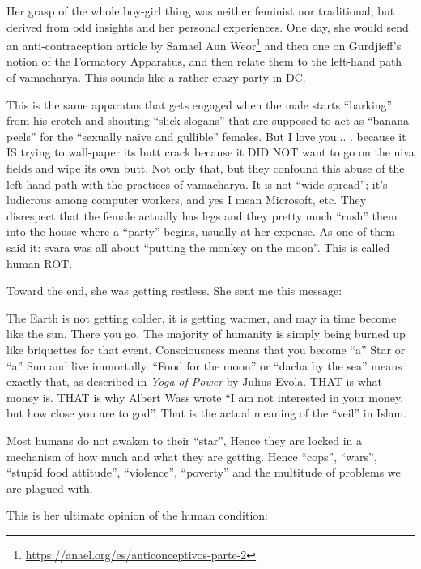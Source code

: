 Her grasp of the whole boy-girl thing was neither feminist nor traditional, but derived from odd insights and her personal experiences. One day, she would send an anti-contraception article by Samael Aun Weor\footnote{\url{https://anael.org/es/anticonceptivos-parte-2}} and then one on Gurdjieff's notion of the Formatory Apparatus, and then relate them to the left-hand path of vamacharya. This sounds like a rather crazy party in DC.

\begin{quotex}
This is the same apparatus that gets engaged when the male starts ``barking'' from his crotch and shouting ``slick slogans'' that are supposed to act as ``banana peels'' for the ``sexually naive and gullible'' females. But I love you... . because it IS trying to wall-paper its butt crack because it DID NOT want to go on the niva fields and wipe its own butt. Not only that, but they confound this abuse of the left-hand path with the practices of vamacharya. It is not ``wide-spread''; it's ludicrous among computer workers, and yes I mean Microsoft, etc. They disrespect that the female actually has legs and they pretty much ``rush'' them into the house where a ``party'' begins, usually at her expense. As one of them said it: svara was all about ``putting the monkey on the moon''. This is called human ROT.
\end{quotex}


Toward the end, she was getting restless. She sent me this message:

\begin{quotationx}
The Earth is not getting colder, it is getting warmer, and may in time become like the sun. There you go. The majority of humanity is simply being burned up like briquettes for that event. Consciousness means that you become ``a'' Star or ``a'' Sun and live immortally. ``Food for the moon'' or ``dacha by the sea'' means exactly that, as described in \emph{Yoga of Power} by Julius Evola. THAT is what money is. THAT is why Albert Wass wrote ``I am not interested in your money, but how close you are to god''. That is the actual meaning of the ``veil'' in Islam.

Most humans do not awaken to their ``star'', Hence they are locked in a mechanism of how much and what they are getting. Hence ``cops'', ``wars'', ``stupid food attitude'', ``violence'', ``poverty'' and the multitude of problems we are plagued with.
\end{quotationx}


This is her ultimate opinion of the human condition:

